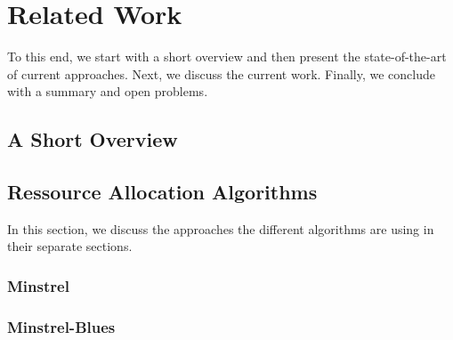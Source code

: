 \chapter{Related Work}
\label{chap:related_work}

%
To this end, we start with a short overview and then present the state-of-the-art of current approaches. Next, we discuss the current work.
%
Finally, we conclude with a summary and open problems.


\section{A Short Overview}
\label{sec:related_work:basics}



\section{Ressource Allocation Algorithms}
\label{sec:related_work:algorithms}
%
In this section, we discuss the approaches the different algorithms are using in their separate sections.
%

\subsection{Minstrel}
\label{ssec:related_work:minstrel}



\subsection{Minstrel-Blues}
\label{ssec:related_work:minstrel-b}
%

